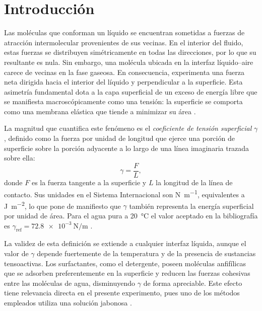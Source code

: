 
\section{Introducción}

Las moléculas que conforman un líquido se encuentran sometidas a fuerzas de
atracción intermolecular provenientes de sus vecinas. En el interior del fluido,
estas fuerzas se distribuyen simétricamente en todas las direcciones, por lo que su
resultante es nula. Sin embargo, una molécula ubicada en la interfaz
líquido--aire carece de vecinas en la fase gaseosa. En consecuencia, experimenta
una fuerza neta dirigida hacia el interior del líquido y perpendicular a la superficie.
Esta asimetría fundamental dota a la capa superficial de un exceso de energía libre que se
manifiesta macroscópicamente como una tensión: la superficie se comporta como
una membrana elástica que tiende a minimizar su área \cite{serway}.

La magnitud que cuantifica este fenómeno es el \textit{coeficiente de tensión
superficial} $\gamma$, definido como la fuerza por unidad de longitud que ejerce
una porción de superficie sobre la porción adyacente a lo largo de una línea
imaginaria trazada sobre ella:
\begin{equation}
    \gamma = \frac{F}{L},
\end{equation}
donde $F$ es la fuerza tangente a la superficie y $L$ la longitud de la línea de
contacto. Sus unidades en el Sistema Internacional son \unit{\newton\per\meter},
equivalentes a \unit{\joule\per\meter\squared}, lo que pone de manifiesto que
$\gamma$ también representa la energía superficial por unidad de área. Para el
agua pura a \SI{20}{\celsius} el valor aceptado en la bibliografía es
$\gamma_{\text{ref}} = \SI{72.8e-3}{\newton\per\meter}$ \cite{halliday}.

La validez de esta definición se extiende a cualquier interfaz líquida, aunque el
valor de $\gamma$ depende fuertemente de la temperatura y de la presencia de
sustancias tensoactivas. Los surfactantes, como el detergente, poseen moléculas
anfifílicas que se adsorben preferentemente en la superficie y reducen las fuerzas
cohesivas entre las moléculas de agua, disminuyendo $\gamma$ de forma apreciable.
Este efecto tiene relevancia directa en el presente experimento, pues uno de los
métodos empleados utiliza una solución jabonosa \cite{serway}.

